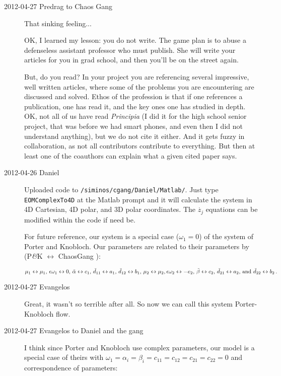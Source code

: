 \begin{description}
\item[2012-04-27 Predrag to Chaos Gang] That sinking feeling...

OK, I learned my lesson:
{you} do not write. The game plan is to abuse a defenseless assistant
professor who must publish. She will write your articles for you in grad
school, and then you'll be on the street again.

But, do you read? In your project you are referencing several impressive,
well written {\twoMode} articles, where some of the problems you are
encountering are discussed and solved. Ethos of the profession is that if
one references a publication, one has read it, and the key ones one has
studied in depth. OK, not all of us have read \emph{Principia} (I did it
for the high school senior project, that was before we had smart phones,
and even then I did not understand anything), but we do not cite it
either. And it gets fuzzy in collaboration, as not all contributors
contribute to everything. But then at least one of the coauthors can
explain what a given cited paper says.

\item[2012-04-26 Daniel] Uploaded code to
\texttt{/siminos/cgang/Daniel/Matlab/}. Just type \texttt{EOMComplexTo4D}
at the Matlab prompt and it will calculate the system in 4D Cartesian, 4D
polar, and 3D polar coordinates. The $\dot{z_j}$ equations can be
modified within the code if need be.

For future reference, our {\twoMode} system  is a
special case ($\omega_1 = 0$) of the system of Porter and
Knobloch. Our parameters are related to their parameters by
(P\textit{\&}K $\leftrightarrow$ ChaosGang {\twoMode}):

\(
  \mu_1 \leftrightarrow \mu_1,\, \epsilon \omega_1 \leftrightarrow 0,\,
  \tilde{\alpha} \leftrightarrow c_1,\, \tilde{d}_{11} \leftrightarrow a_1,\,
  \tilde{d}_{12} \leftrightarrow b_1,\, \mu_2 \leftrightarrow \mu_2,\,
  \\
  \epsilon \omega_2 \leftrightarrow -e_2,\, \tilde{\beta} \leftrightarrow c_2,\,
  \tilde{d}_{21} \leftrightarrow a_2,$ and  $\tilde{d}_{22} \leftrightarrow b_2
\,.
\)

\item[2012-04-27 Evangelos] Great, it wasn't so terrible after all. So
now we can call this system Porter-Knobloch flow.

\item[2012-04-27 Evangelos to Daniel and the gang]
I think since Porter and Knobloch  use complex parameters,
our model is a special case of theirs with
$\omega_1=\alpha_i =\beta_i=c_{11}=c_{12}=c_{21}=c_{22} = 0$
and correspondence of parameters:


\end{description}
